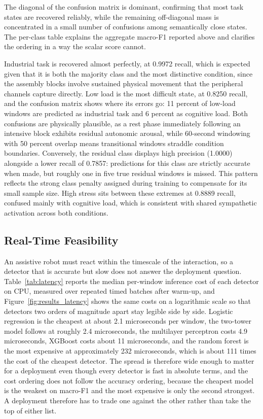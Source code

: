 \documentclass[a4paper,twoside]{article}
\begin{document}
The diagonal of the confusion matrix is dominant, confirming that most task states are recovered reliably, while the remaining off-diagonal mass is concentrated in a small number of confusions among semantically close states. The per-class table explains the aggregate macro-F1 reported above and clarifies the ordering in a way the scalar score cannot.

Industrial task is recovered almost perfectly, at 0.9972 recall, which is expected given that it is both the majority class and the most distinctive condition, since the assembly blocks involve sustained physical movement that the peripheral channels capture directly. Low load is the most difficult state, at 0.8250 recall, and the confusion matrix shows where its errors go: 11 percent of low-load windows are predicted as industrial task and 6 percent as cognitive load. Both confusions are physically plausible, as a rest phase immediately following an intensive block exhibits residual autonomic arousal, while 60-second windowing with 50 percent overlap means transitional windows straddle condition boundaries. Conversely, the residual class displays high precision (1.0000) alongside a lower recall of 0.7857: predictions for this class are strictly accurate when made, but roughly one in five true residual windows is missed. This pattern reflects the strong class penalty assigned during training to compensate for its small sample size. High stress sits between these extremes at 0.8889 recall, confused mainly with cognitive load, which is consistent with shared sympathetic activation across both conditions.

\subsection{Real-Time Feasibility}

\noindent An assistive robot must react within the timescale of the interaction, so a detector that is accurate but slow does not answer the deployment question. Table~\ref{tab:latency} reports the median per-window inference cost of each detector on CPU, measured over repeated timed batches after warm-up, and Figure~\ref{fig:results_latency} shows the same costs on a logarithmic scale so that detectors two orders of magnitude apart stay legible side by side. Logistic regression is the cheapest at about 2.1 microseconds per window, the two-tower model follows at roughly 2.4 microseconds, the multilayer perceptron costs 4.9 microseconds, \acs{XGBoost} costs about 11 microseconds, and the random forest is the most expensive at approximately 232 microseconds, which is about 111 times the cost of the cheapest detector. The spread is therefore wide enough to matter for a deployment even though every detector is fast in absolute terms, and the cost ordering does not follow the accuracy ordering, because the cheapest model is the weakest on macro-F1 and the most expensive is only the second strongest. A deployment therefore has to trade one against the other rather than take the top of either list.
\end{document}
